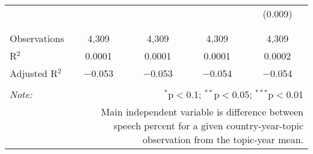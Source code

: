 \begin{table}[!htbp]
\begin{tabular}{@{\extracolsep{5pt}}lcccc}
  &  &  &  & (0.009) \\ 
  & & & & \\ 
\hline \\[-1.8ex] 
Observations & 4,309 & 4,309 & 4,309 & 4,309 \\ 
R$^{2}$ & 0.0001 & 0.0001 & 0.0001 & 0.0002 \\ 
Adjusted R$^{2}$ & $-$0.053 & $-$0.053 & $-$0.054 & $-$0.054 \\ 
\hline 
\hline \\[-1.8ex] 
\textit{Note:}  & \multicolumn{4}{r}{$^{*}$p$<$0.1; $^{**}$p$<$0.05; $^{***}$p$<$0.01} \\ 
 & \multicolumn{4}{r}{Main independent variable is difference between speech percent for a given country-year-topic observation from the topic-year mean.} \\ 
\end{tabular} 
\end{table} 
